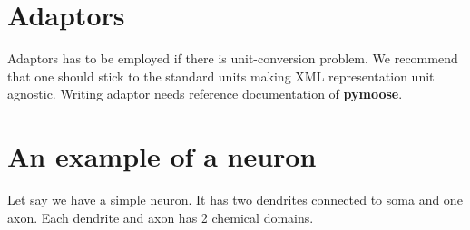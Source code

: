 \section{Adaptors}

Adaptors has to be employed if there is unit-conversion problem. We recommend
that one should stick to the standard units making XML representation unit
agnostic. Writing adaptor needs reference documentation of \textbf{pymoose}.

\section{An example of a neuron}

Let say we have a simple neuron. It has two dendrites connected to soma and one
axon. Each dendrite and axon has 2 chemical domains. 







